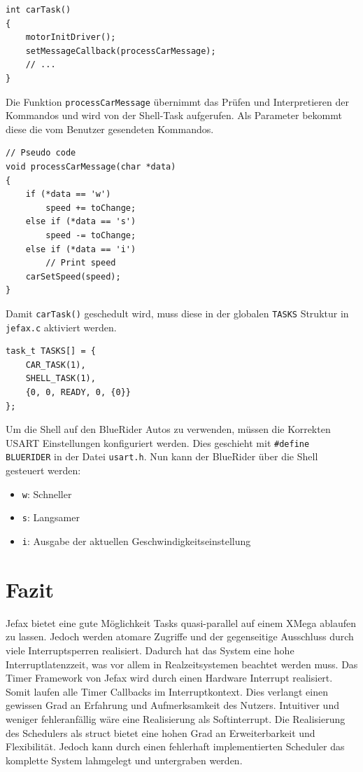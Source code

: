 \documentclass[fontsize=12pt, toc=bibliography, notitlepage]{scrreprt}
\begin{document}
\begin{lstlisting}[title=car\_control.c]
int carTask()
{
    motorInitDriver();
    setMessageCallback(processCarMessage);
    // ...
}
\end{lstlisting}

Die Funktion \lstinline$processCarMessage$ übernimmt das Prüfen und Interpretieren der Kommandos und wird von der Shell-Task aufgerufen. Als Parameter bekommt diese die vom Benutzer gesendeten Kommandos.

\begin{lstlisting}[title=car\_control.c]
// Pseudo code
void processCarMessage(char *data)
{
    if (*data == 'w')
        speed += toChange;
    else if (*data == 's')
        speed -= toChange;
    else if (*data == 'i')
    	// Print speed
    carSetSpeed(speed);
}
\end{lstlisting}

Damit \lstinline$carTask()$ geschedult wird, muss diese in der globalen \lstinline$TASKS$ Struktur in \lstinline$jefax.c$ aktiviert werden.

\begin{lstlisting}[title=jefax.c]
task_t TASKS[] = {
    CAR_TASK(1),
    SHELL_TASK(1),
    {0, 0, READY, 0, {0}}
};
\end{lstlisting}

Um die Shell auf den BlueRider Autos zu verwenden, müssen die Korrekten USART Einstellungen konfiguriert werden. Dies geschieht mit \lstinline$#define BLUERIDER$ in der Datei \lstinline$usart.h$. Nun kann der BlueRider über die Shell gesteuert werden:

\begin{itemize}
	\item \lstinline$w$: Schneller
	\item \lstinline$s$: Langsamer
	\item \lstinline$i$: Ausgabe der aktuellen Geschwindigkeitseinstellung
\end{itemize}

\chapter{Fazit}
\label{chap:fazit}
Jefax bietet eine gute Möglichkeit Tasks quasi-parallel auf einem XMega ablaufen zu lassen. Jedoch werden atomare Zugriffe und der gegenseitige Ausschluss durch viele Interruptsperren realisiert. Dadurch hat das System eine hohe Interruptlatenzzeit, was vor allem in Realzeitsystemen beachtet werden muss.
Das Timer Framework von Jefax wird durch einen Hardware Interrupt realisiert. Somit laufen alle Timer Callbacks im Interruptkontext. Dies verlangt einen gewissen Grad an Erfahrung und Aufmerksamkeit des Nutzers. Intuitiver und weniger fehleranfällig wäre eine Realisierung als Softinterrupt.
Die Realisierung des Schedulers als struct bietet eine hohen Grad an Erweiterbarkeit und Flexibilität. Jedoch kann durch einen fehlerhaft implementierten Scheduler das komplette System lahmgelegt und untergraben werden.

\cleardoublepage
{}
\listoffigures
\end{document}
